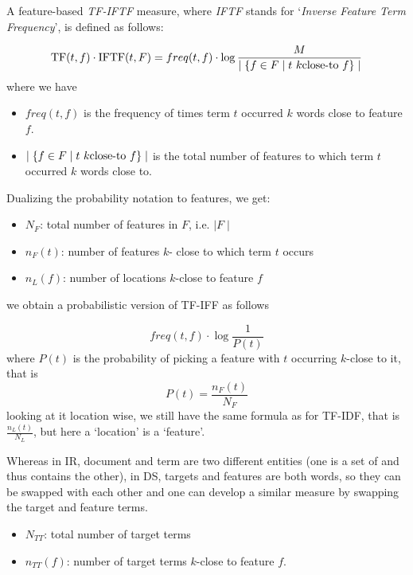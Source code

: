 \begin{definition}
A feature-based  \emph{TF-IFTF}  measure, where \emph{IFTF} stands for `\emph{Inverse Feature Term Frequency}', is defined as follows:

\begin{equation}
\label{tf-iftf}
\textmd{TF}(t,f) \cdot \textmd{IFTF}(t, F) = freq(t, f) \cdot \log{{M} \over {\mid \{f \in F \mid t  \ k\textmd{close-to} \ f \} \mid}}
\end{equation}
where we have
\begin{itemize}
\item $freq(t, f)$ is the frequency of times term $t$ occurred $k$ words close to feature $f$.
\item $\mid \{f \in F \mid t  \ k\textmd{close-to} \ f \} \mid$ is the total number of features to which term $t$ occurred $k$ words close to. 
\end{itemize}

\end{definition}


Dualizing the  probability notation to  features, we get:

\begin{itemize}
\item $N_F$: total number of features in $F$, i.e. $\mid F \mid$
\item  $n_F (t)$: number of features $k$- close to which term $t$ occurs
\item  $n_L(f)$: number of locations $k$-close to feature $f$
\end{itemize}

we obtain a probabilistic version of TF-IFF as follows

\[
freq(t,f) \cdot \log{\frac{1}{P(t)}}
\]
where   $P(t)$ is the probability of picking a feature with $t$ occurring $k$-close to it, that is
\[
P(t) = \frac{n_F(t)}{N_F}
\]
looking at it location wise, we still have the same formula as for TF-IDF, that is $\frac{n_L(t)}{N_L}$, but here a `location'  is a `feature'.  


\medskip
Whereas in IR, document and term are two different entities (one is a set of and thus contains the other), in  DS, targets  and features are both words, so they can be swapped with each other and one  can  develop a similar measure by swapping the target and feature terms. 

\begin{itemize}
\item $N_{TT}$: total number of target terms
\item  $n_{TT}(f)$: number of target terms  $k$-close to feature $f$.
\end{itemize}

